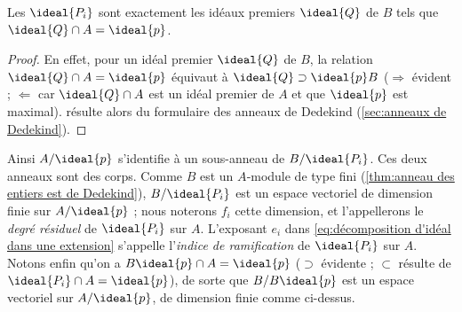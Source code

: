 \documentclass[11pt, %
  title in boldface,
  theorem in new line,
  theorem numbering = section,
  number theorems separately,
  simple name,
]{beaulivre}
\begin{document}
    \begin{proposition}\label{prop:facteurs premiers dans la décomposition d'idéal dans une extension}
        Les \( \ideal{P_i} \) sont exactement les idéaux premiers \( \ideal{Q} \) de \( B \) tels que \( \ideal{Q} \cap A = \ideal{p} \).
    \end{proposition}
    \begin{proof}
        En effet, pour un idéal premier \( \ideal{Q} \) de \( B \), la relation \( \ideal{Q} \cap A = \ideal{p} \) équivaut à \( \ideal{Q} \supset \ideal{p} B \) (\( \Rightarrow \) évident ; \( \Leftarrow \) car \( \ideal{Q} \cap A \) est un idéal premier de \( A \) et que \( \ideal{p} \) est maximal).  résulte alors du formulaire des anneaux de Dedekind (\cref{sec:anneaux de Dedekind}).
    \end{proof}

    Ainsi \( A/\ideal{p} \) s'identifie à un sous-anneau de \( B/\ideal{P_i} \). Ces deux anneaux sont des corps. Comme \( B \) est un \( A \)‑module de type fini (\cref{thm:anneau des entiers est de Dedekind}), \( B/\ideal{P_i} \) est un espace vectoriel de dimension finie sur \( A/\ideal{p} \) ; nous noterons \( f_i \) cette dimension, et l'appellerons le \emph{degré résiduel} de \( \ideal{P_i} \) sur \( A \). L'exposant \( e_i \) dans \eqref{eq:décomposition d'idéal dans une extension} s'appelle l'\emph{indice de ramification} de \( \ideal{P_i} \) sur \( A \). Notons enfin qu'on a \( B \ideal{p} \cap A = \ideal{p} \) (\( \supset \) évidente ; \( \subset \) résulte de \( \ideal{P_i} \cap A = \ideal{p} \)), de sorte que \( B/B\ideal{p} \) est un espace vectoriel sur \( A/\ideal{p} \), de dimension finie comme ci-dessus.
\end{document}
